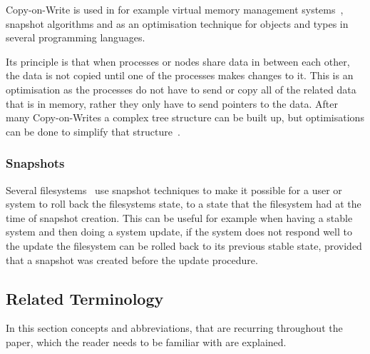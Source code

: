 \documentclass[a4paper,12pt]{article}
\begin{document}
Copy-on-Write is used in for example virtual memory management systems~\cite{VIRTCOW}, snapshot
algorithms and as an optimisation technique for objects and types in several programming
languages\cite{LANGCOW}.

Its principle is that when processes or nodes share data in between each other, the data is not
copied until one of the processes makes changes to it. This is an optimisation as the processes do
not have to send or copy all of the related data that is in memory, rather they only have to send
pointers to the data. After many Copy-on-Writes a complex tree structure can be built up, but
optimisations can be done to simplify that structure~\cite{COPYONWRITE2}.

\subsubsection{Snapshots}
Several filesystems~\cite{BTRFS}\cite{ZFS} use snapshot techniques to make it possible for a user
or system to roll back the filesystems state, to a state that the filesystem had at the time of
snapshot creation. This can be useful for example when having a stable system and then doing a
system update, if the system does not respond well to the update the filesystem can be rolled
back to its previous stable state, provided that a snapshot was created before the update procedure.

\newpage
\subsection{Related Terminology}
In this section concepts and abbreviations, that are recurring throughout the paper, which the
reader needs to be familiar with are explained.
\end{document}
